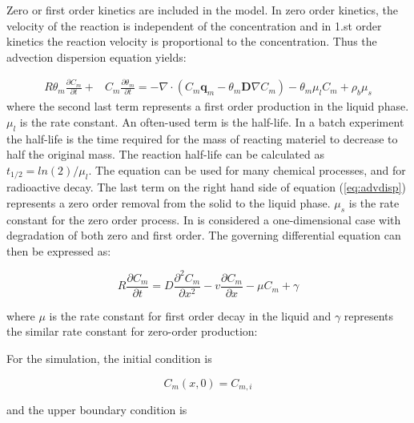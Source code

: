 \documentclass{report}
\begin{document}
Zero or first order kinetics are included in the model. In zero order
kinetics, the velocity of the reaction is
independent of the concentration and in 1.st order
kinetics the reaction velocity is
proportional to the concentration. Thus the advection dispersion
equation yields:

\begin{equation}
\begin{split}
 R\theta_{m} \frac{\partial C_{m}}{\partial t} +& C_{m} \frac{\partial
  \theta_{m}}{\partial t} =  -\nabla \cdot(C_{m}
  \mathbf{q}_{m}-\theta_{m} \mathbf{D}\nabla C_{m})- \theta_{m} \mu_l C_{m} +
  \rho_b \mu_s
\label{eq:advdisp}
\end{split}
\end{equation}
%
where the second last term represents a first order production in
the liquid phase.  $\mu_l$ is the rate constant. An often-used term
is the half-life. In a batch experiment
the half-life is the time required for the mass of reacting materiel to
decrease to half the original mass. The reaction half-life can be
calculated as $t_{1/2}=ln(2)/\mu_l$. The equation can be used for
many chemical processes, and for radioactive
decay. The last term on the right hand
side of equation (\ref{eq:advdisp}) represents a zero order
removal from the solid to the liquid phase. $\mu_s$ is the rate
constant for the zero order process. In \cite{Genuchtenanalytical}
is considered a one-dimensional case with degradation of both zero
and first order. The governing differential equation can then be
expressed as:

\begin{equation}
R\frac{\partial C_m}{\partial t}=D\frac{\partial^2C_m}{\partial
  x^2}-v\frac{\partial C_m}{\partial x}-\mu C_m +\gamma
\end{equation}

where $\mu$ is the rate constant for first order decay in the liquid
and $\gamma$ represents the similar rate constant for zero-order
production:

For the simulation, the initial condition is

\begin{equation}
C_m(x,0)=C_{m,i}
\end{equation}

and the upper boundary condition is

\end{document}
